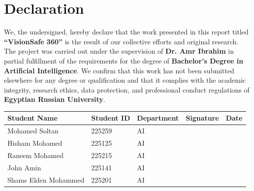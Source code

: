 



\tableofcontents
\cleardoublepage

\chapter*{Declaration}

We, the undersigned, hereby declare that the work presented in this report titled \textbf{``VisionSafe 360''} is the result of our collective efforts and original research. The project was carried out under the supervision of \textbf{Dr. Amr Ibrahim} in partial fulfillment of the requirements for the degree of \textbf{Bachelor's Degree in Artificial Intelligence}. We confirm that this work has not been submitted elsewhere for any degree or qualification and that it complies with the academic integrity, research ethics, data protection, and professional conduct regulations of \textbf{Egyptian Russian University}.

\begin{table}[H]
\centering
\begin{tabular}{|l|l|l|l|l|}
\hline
\textbf{Student Name} & \textbf{Student ID} & \textbf{Department} & \textbf{Signature} & \textbf{Date} \\
\hline
Mohamed Soltan & 225259 & AI &  &  \\
\hline
Hisham Mohamed & 225125 & AI &  &  \\
\hline
Raneem Mohamed & 225215 & AI &  &  \\
\hline
John Amin & 225141 & AI &  &  \\
\hline
Shams Elden Mohammed & 225201 & AI &  &  \\
\hline
\end{tabular}
\end{table}


